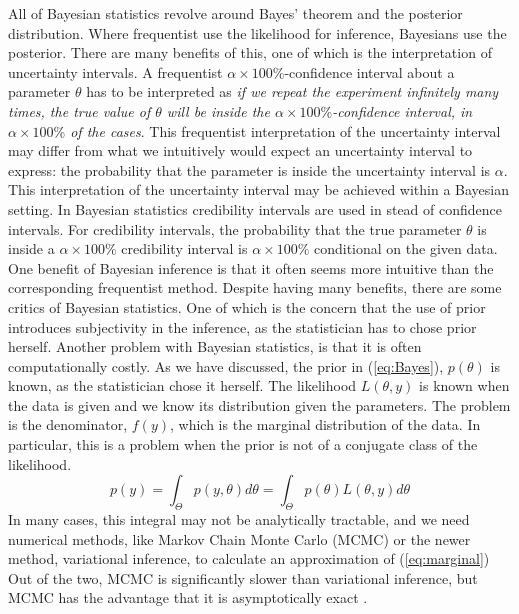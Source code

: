 All of Bayesian statistics revolve around Bayes' theorem and the posterior distribution. Where frequentist use the likelihood for inference, Bayesians use the posterior.  
There are many benefits of this, one of which is the interpretation of uncertainty intervals. 
A frequentist $\alpha \times 100\%$-confidence interval about a parameter $\theta$ has to be interpreted as \textit{if we repeat the experiment infinitely many times, the true value of $\theta$ will be inside the $\alpha\times 100\%$-confidence interval, in $\alpha\times 100\%$ of the cases}.
This frequentist interpretation of the uncertainty interval may differ from what we intuitively would expect an uncertainty interval to express: the probability that the parameter is inside the uncertainty interval is $\alpha$. 
This interpretation of the uncertainty interval may be achieved within a Bayesian setting.
In Bayesian statistics credibility intervals are used in stead of confidence intervals.
For credibility intervals, the probability that the true parameter $\theta$ is inside a $\alpha\times 100\%$ credibility interval is $\alpha\times 100\%$ conditional on the given data. 
One benefit of Bayesian inference is that it often seems more intuitive than the corresponding frequentist method.
Despite having many benefits, there are some critics of Bayesian statistics. One of which is the concern that the use of prior introduces subjectivity in the inference, as the statistician has to chose prior herself\cite{gelman2008objections}.
Another problem with Bayesian statistics, is that it is often computationally costly.
As we have discussed, the prior in (\ref{eq:Bayes}), $p\left(\theta\right)$ is known, as the statistician chose it herself. The likelihood $L\left(\theta, y\right)$ is known when the data is given and we know its distribution given the parameters.
The problem is the denominator, $f\left(y\right)$, which is the marginal distribution of the data. In particular, this is a problem when the prior is not of a conjugate class of the likelihood. 
\begin{equation}\label{eq:marginal}
    p\left(y\right) = \int_{\Theta}p\left(y,\theta\right) d\theta = \int_{\Theta} p\left(\theta\right)L\left(\theta, y\right) d\theta
\end{equation}
In many cases, this integral may not be analytically tractable, and we need numerical methods, like Markov Chain Monte Carlo (MCMC) or the newer method, variational inference, to calculate an approximation of (\ref{eq:marginal}) Out of the two, MCMC is significantly slower than variational inference, but MCMC has the advantage that it is asymptotically exact \cite{vi}.

